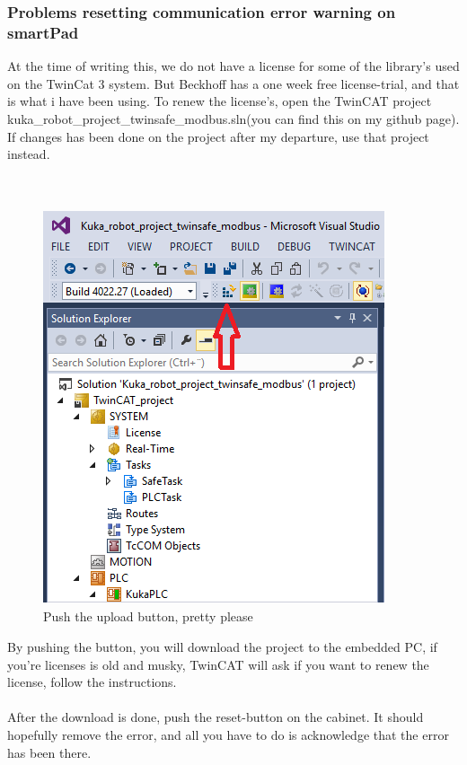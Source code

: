 \documentclass{article}
\begin{document}
    \subsubsection{Problems resetting communication error warning on smartPad}
    At the time of writing this, we do not have a license for some of the library's used on the TwinCat 3 system. But Beckhoff has a one week free license-trial, and that is what i have been using. To renew the license's, open the TwinCAT project kuka\_robot\_project\_twinsafe\_modbus.sln(you can find this on my github page). If changes has been done on the project after my departure, use that project instead. 
    \\\\\
    \begin{figure}[!h]
        \centering
        \includegraphics[width=\textwidth]{Pictures/twincat_upload_installation.png}
        \caption{Push the upload button, pretty please}
        \end{figure}
    By pushing the button, you will download the project to the embedded PC, if you're licenses is old and musky, TwinCAT will ask if you want to renew the license, follow the instructions. 
    \\\\
    After the download is done, push the reset-button on the cabinet. It should hopefully remove the error, and all you have to do is acknowledge that the error has been there.  
\end{document}
